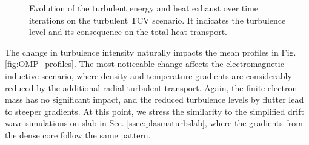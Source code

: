 \begin{figure}[H]
\begin{subfigure}[t]{0.45\textwidth}
		\label{fig:HeatExhaust}
	\end{subfigure}
	\caption[Evolution of the turbulent energy and heat exhaust over time iterations on the turbulent TCV scenario]{Evolution of the turbulent energy and heat exhaust over time iterations on the turbulent TCV scenario. It indicates the turbulence level and its consequence on the total heat transport.}
	\label{fig:plasmaEvolution}
\end{figure}

The change in turbulence intensity naturally impacts the mean profiles in Fig. \ref{fig:OMP_profiles}. The most noticeable change affects the electromagnetic inductive scenario, where density and temperature gradients are considerably reduced by the additional radial turbulent transport. Again, the finite electron mass has no significant impact, and the reduced turbulence levels by flutter lead to steeper gradients. At this point, we stress the similarity to the simplified drift wave simulations on slab in Sec. \ref{ssec:plasmaturbslab}, where the gradients from the dense core follow the same pattern. \newline

